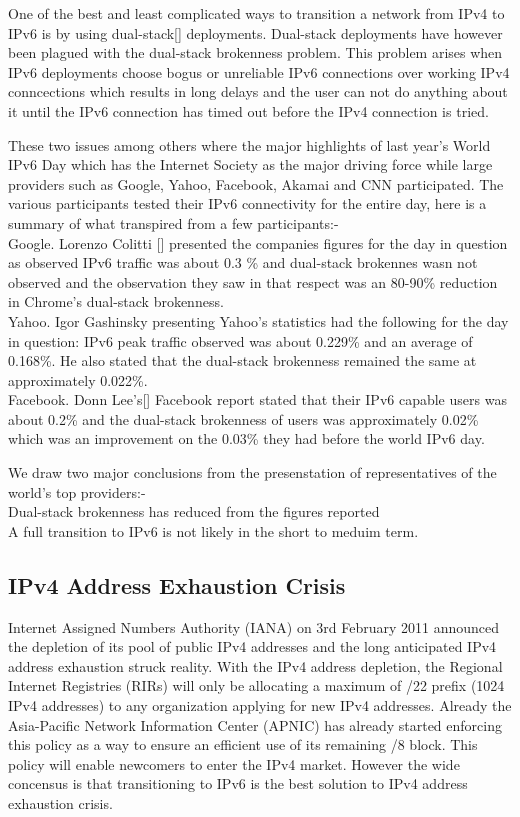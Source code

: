 \documentclass[iwp,first]{luthesis}
\begin{document}
One of the best and least complicated ways to transition a network from IPv4 to IPv6 is by using dual-stack[] deployments. Dual-stack deployments have however been plagued with the dual-stack brokenness problem. This problem arises when IPv6 deployments choose bogus or unreliable IPv6 connections over working IPv4 conncections which results in long delays and the user can not do anything about it until the IPv6 connection has timed out before the IPv4 connection is tried. 


These two issues among others where the major highlights of last year's World IPv6 Day which has the Internet Society as the major driving force while large providers such as Google, Yahoo, Facebook, Akamai and CNN participated. The various participants tested their IPv6 connectivity for the entire day, here is a summary of what transpired from a few participants:-
\\ Google. Lorenzo Colitti [] presented the companies figures for the day in question as observed IPv6 traffic was about 0.3 \% and dual-stack brokennes wasn not observed and the observation they saw in that respect was an 80-90\% reduction in Chrome's dual-stack brokenness. 
\\ Yahoo. Igor Gashinsky presenting Yahoo's statistics had the following for the day in question: IPv6 peak traffic observed was about 0.229\% and an average of 0.168\%. He also stated that the dual-stack brokenness remained the same at approximately 0.022\%.  
\\ Facebook. Donn Lee's[] Facebook report stated that their IPv6 capable users was about 0.2\% and the dual-stack brokenness of users was approximately 0.02\%  which was an improvement on the 0.03\% they had before the world IPv6 day.

We draw two major conclusions from the presenstation of representatives of the world's top providers:- 
\\Dual-stack brokenness has reduced from the figures reported
\\A full transition to IPv6 is not likely in the short to meduim term. 

\subsection{IPv4 Address Exhaustion Crisis}

Internet Assigned Numbers Authority (IANA) on 3rd February 2011 announced the depletion of its pool of public IPv4 addresses and the long anticipated IPv4 address exhaustion struck reality. With the IPv4 address depletion, the Regional Internet Registries (RIRs) will only be allocating a maximum of /22 prefix (1024 IPv4 addresses) to any organization applying for new IPv4 addresses. Already the Asia-Pacific Network Information Center (APNIC) has already started enforcing this policy as a way to ensure an efficient use of its remaining /8 block. This policy will enable newcomers to enter the IPv4 market. However the wide concensus is that transitioning to IPv6 is the best solution to IPv4 address exhaustion crisis.
\end{document}
